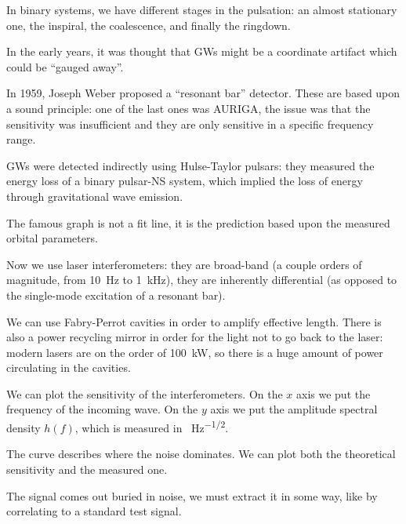 \documentclass[main.tex]{subfiles}
\begin{document}
In binary systems, we have different stages in the pulsation: an almost stationary one, the inspiral, the coalescence, and finally the ringdown.

In the early years, it was thought that GWs might be a coordinate artifact which could be ``gauged away''.

In 1959, Joseph Weber proposed a ``resonant bar'' detector. These are based upon a sound principle: one of the last ones was AURIGA, the issue was that the sensitivity was insufficient and they are only sensitive in a specific frequency range.

GWs were detected indirectly using Hulse-Taylor pulsars: they measured the energy loss of a binary pulsar-NS system, which implied the loss of energy through gravitational wave emission.

The famous graph is not a fit line, it is the prediction based upon the measured orbital parameters.

Now we use laser interferometers: they are broad-band (a couple orders of magnitude, from \SI{10}{Hz} to \SI{1}{kHz}), they are inherently differential (as opposed to the single-mode excitation of a resonant bar). 

We can use Fabry-Perrot cavities in order to amplify effective length. 
There is also a power recycling mirror in order for the light not to go back to the laser: modern lasers are on the order of \SI{100}{kW}, so there is a huge amount of power circulating in the cavities.

We can plot the sensitivity of the interferometers. 
On the \(x\) axis we put the frequency of the incoming wave. 
On the \(y\) axis we put the amplitude spectral density \(h(f)\), which is measured in \SI{}{Hz^{-1/2}}. 


The curve describes where the noise dominates. 
We can plot both the theoretical sensitivity and the measured one.

The signal comes out buried in noise, we must extract it in some way, like by correlating to a standard test signal.
\end{document}
